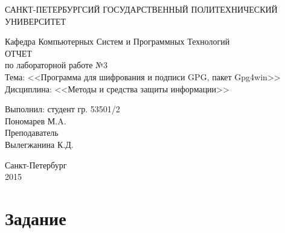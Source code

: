 \documentclass[utf8x, 12pt]{G7-32}
\begin{document}
\frontmatter 


\begin{center} 

\large САНКТ-ПЕТЕРБУРГСИЙ ГОСУДАРСТВЕННЫЙ ПОЛИТЕХНИЧЕСКИЙ УНИВЕРСИТЕТ

\large Кафедра Компьютерных Систем и Программных Технологий \\[5.5cm] 

\huge ОТЧЕТ \\[0.6cm] %
\large по лабораторной работе №3\\
\large Тема: <<Программа для шифрования и подписи GPG, пакет Gpg4win>>\\
\large Дисциплина: <<Методы и средства защиты информации>>\\[3.7cm]

\end{center} 

\begin{flushright}
Выполнил: студент гр. 53501/2 \\
Пономарев М.A. \\[1.2cm]


Преподаватель \\
Вылегжанина К.Д.
\end{flushright}


\vfill 

\begin{center} 
\large Санкт-Петербург \\
2015
\end{center} 

\thispagestyle{empty}



\thispagestyle{empty}
\setcounter{page}{0}
\tableofcontents
\clearpage
\mainmatter


\chapter{Задание}
\end{document}
